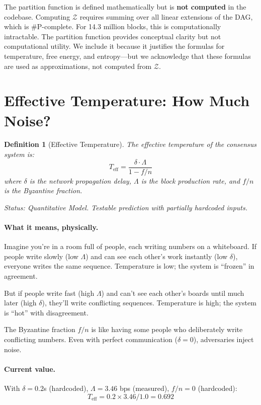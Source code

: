 \documentclass[11pt,a4paper]{article}
\newtheorem{definition}[theorem]{Definition}
\begin{document}
\begin{honesty}
The partition function is defined mathematically but is \textbf{not computed} in the codebase. Computing $\mathcal{Z}$ requires summing over all linear extensions of the DAG, which is \#P-complete. For 14.3 million blocks, this is computationally intractable. The partition function provides conceptual clarity but not computational utility. We include it because it justifies the formulas for temperature, free energy, and entropy---but we acknowledge that these formulas are used as approximations, not computed from $\mathcal{Z}$.
\end{honesty}

\section{Effective Temperature: How Much Noise?}

\begin{definition}[Effective Temperature]
The effective temperature of the consensus system is:
\begin{equation}
\boxed{T_{\text{eff}} = \frac{\delta \cdot \Lambda}{1 - f/n}}
\end{equation}
where $\delta$ is the network propagation delay, $\Lambda$ is the block production rate, and $f/n$ is the Byzantine fraction.
\end{definition}

\emph{Status: \textcolor{hardcoded}{Quantitative Model}. Testable prediction with partially hardcoded inputs.}

\paragraph{What it means, physically.} Imagine you're in a room full of people, each writing numbers on a whiteboard. If people write slowly (low $\Lambda$) and can see each other's work instantly (low $\delta$), everyone writes the same sequence. Temperature is low; the system is ``frozen'' in agreement.

But if people write fast (high $\Lambda$) and can't see each other's boards until much later (high $\delta$), they'll write conflicting sequences. Temperature is high; the system is ``hot'' with disagreement.

The Byzantine fraction $f/n$ is like having some people who deliberately write conflicting numbers. Even with perfect communication ($\delta = 0$), adversaries inject noise.

\paragraph{Current value.} With $\delta = 0.2$s (\textcolor{hardcoded}{hardcoded}), $\Lambda = 3.46$ bps (\textcolor{measured}{measured}), $f/n = 0$ (\textcolor{hardcoded}{hardcoded}):
\[
T_{\text{eff}} = 0.2 \times 3.46 / 1.0 = 0.692
\]
\end{document}
